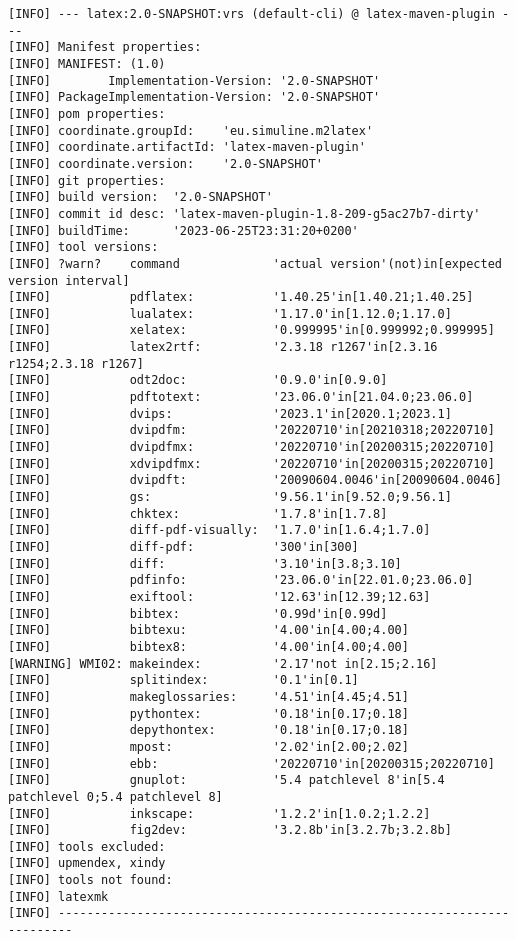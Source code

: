 \begin{lstlisting}[basicstyle=\tiny,
float, captionpos=b, label={lst:vrsOut}, 
caption={Output of goal \texttt{latex:vrs}}]
[INFO] --- latex:2.0-SNAPSHOT:vrs (default-cli) @ latex-maven-plugin ---
[INFO] Manifest properties: 
[INFO] MANIFEST: (1.0)
[INFO]        Implementation-Version: '2.0-SNAPSHOT'
[INFO] PackageImplementation-Version: '2.0-SNAPSHOT'
[INFO] pom properties:
[INFO] coordinate.groupId:    'eu.simuline.m2latex'
[INFO] coordinate.artifactId: 'latex-maven-plugin'
[INFO] coordinate.version:    '2.0-SNAPSHOT'
[INFO] git properties: 
[INFO] build version:  '2.0-SNAPSHOT'
[INFO] commit id desc: 'latex-maven-plugin-1.8-209-g5ac27b7-dirty'
[INFO] buildTime:      '2023-06-25T23:31:20+0200'
[INFO] tool versions: 
[INFO] ?warn?    command             'actual version'(not)in[expected version interval]
[INFO]           pdflatex:           '1.40.25'in[1.40.21;1.40.25]
[INFO]           lualatex:           '1.17.0'in[1.12.0;1.17.0]
[INFO]           xelatex:            '0.999995'in[0.999992;0.999995]
[INFO]           latex2rtf:          '2.3.18 r1267'in[2.3.16 r1254;2.3.18 r1267]
[INFO]           odt2doc:            '0.9.0'in[0.9.0]
[INFO]           pdftotext:          '23.06.0'in[21.04.0;23.06.0]
[INFO]           dvips:              '2023.1'in[2020.1;2023.1]
[INFO]           dvipdfm:            '20220710'in[20210318;20220710]
[INFO]           dvipdfmx:           '20220710'in[20200315;20220710]
[INFO]           xdvipdfmx:          '20220710'in[20200315;20220710]
[INFO]           dvipdft:            '20090604.0046'in[20090604.0046]
[INFO]           gs:                 '9.56.1'in[9.52.0;9.56.1]
[INFO]           chktex:             '1.7.8'in[1.7.8]
[INFO]           diff-pdf-visually:  '1.7.0'in[1.6.4;1.7.0]
[INFO]           diff-pdf:           '300'in[300]
[INFO]           diff:               '3.10'in[3.8;3.10]
[INFO]           pdfinfo:            '23.06.0'in[22.01.0;23.06.0]
[INFO]           exiftool:           '12.63'in[12.39;12.63]
[INFO]           bibtex:             '0.99d'in[0.99d]
[INFO]           bibtexu:            '4.00'in[4.00;4.00]
[INFO]           bibtex8:            '4.00'in[4.00;4.00]
[WARNING] WMI02: makeindex:          '2.17'not in[2.15;2.16]
[INFO]           splitindex:         '0.1'in[0.1]
[INFO]           makeglossaries:     '4.51'in[4.45;4.51]
[INFO]           pythontex:          '0.18'in[0.17;0.18]
[INFO]           depythontex:        '0.18'in[0.17;0.18]
[INFO]           mpost:              '2.02'in[2.00;2.02]
[INFO]           ebb:                '20220710'in[20200315;20220710]
[INFO]           gnuplot:            '5.4 patchlevel 8'in[5.4 patchlevel 0;5.4 patchlevel 8]
[INFO]           inkscape:           '1.2.2'in[1.0.2;1.2.2]
[INFO]           fig2dev:            '3.2.8b'in[3.2.7b;3.2.8b]
[INFO] tools excluded: 
[INFO] upmendex, xindy
[INFO] tools not found: 
[INFO] latexmk
[INFO] ------------------------------------------------------------------------
\end{lstlisting}



